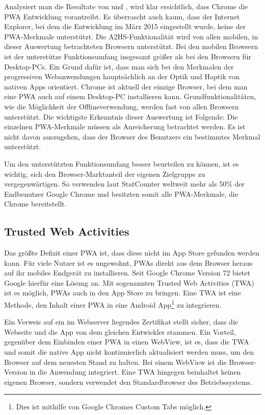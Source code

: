 Analysiert man die Resultate von  und
, wird klar ersichtlich, dass Chrome
die PWA Entwicklung vorantreibt. Es überrascht auch kaum, dass der Internet Explorer,
bei dem die Entwicklung im März 2015 eingestellt wurde, \cite{HeiseInternetExplorer} keine der PWA-Merkmale
unterstützt. Die A2HS-Funktionalität wird von allen
mobilen, in dieser Auswertung betrachteten Browsern unterstützt.
Bei den mobilen Browsern ist der unterstütze Funktionsumfang insgesamt größer als
bei den Browsern für Desktop-PCs. Ein Grund dafür ist, dass man sich bei den Merkmalen der progressiven Webanwendungen
hauptsächlich an der Optik und Haptik von nativen Apps orientiert. Chrome ist aktuell
der einzige Browser, bei dem man eine PWA auch auf einem Desktop-PC installieren
kann. Grundfunktionalitäten, wie  die Möglichkeit der Offlineverwendung, werden fast von allen
Browsern unterstützt. Die wichtigste Erkenntnis dieser Auswertung ist Folgende: Die einzelnen
PWA-Merkmale müssen als Anreicherung betrachtet werden. Es ist nicht davon auszugehen, dass
der Browser des Benutzers ein bestimmtes Merkmal unterstützt.

Um den unterstützten Funktionsumfang besser beurteilen zu können, ist es wichtig,
sich den Browser-Marktanteil der eigenen Zielgruppe zu vergegenwärtigen.
So verwenden laut StatCounter weltweit mehr als 50\% der Endbenutzer Google Chrome und besitzten somit
alle PWA-Merkmale, die Chrome bereitstellt.\cite{StatCounterBrowserMarketShare}

\subsection{Trusted Web Activities}
\label{subsec:trustedwebactivities}
Das größte Defizit einer PWA ist, dass diese nicht im App Store gefunden werden kann.
Für viele Nutzer ist es ungewohnt, PWAs direkt aus dem Browser heraus auf ihr mobiles Endgerät zu installieren.
Seit Google Chrome Version 72 bietet Google hierfür eine Lösung an.
Mit sogenannten Trusted Web Activities (TWA) ist es möglich, PWAs auch in den App Store
zu bringen. Eine TWA ist eine Methode, den Inhalt einer PWA in eine Android App\footnote{Dies ist mithilfe von Google Chromes Custom Tabs möglich.}
zu integrieren.\cite{TrustedWebActivitiesGoogle}

Ein Verweis auf ein im Webserver liegendes Zertifikat stellt sicher,
dass die Webseite und die App von dem gleichen Entwickler
stammen. Ein Vorteil, gegenüber dem Einbinden einer PWA in einen WebView, ist es,
dass die TWA und somit die native App nicht kontinuierlich aktualisiert werden muss,
um den Browser auf dem neuesten Stand zu halten. Bei einem WebView ist die Browser-Version in
die Anwendung integriert. Eine TWA hingegen beinhaltet keinen eigenen Browser, sondern verwendet
den Standardbrowser des Betriebssystems.

